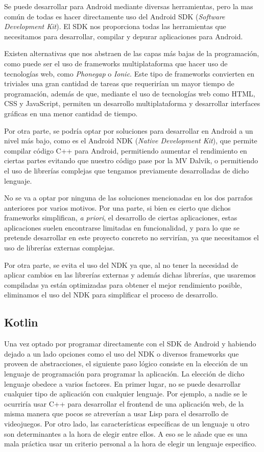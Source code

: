 Se puede desarrollar para Android mediante diversas herramientas, pero la mas común de todas es hacer directamente uso del Android SDK (\textit{Software Development Kit}). El SDK nos proporciona todas las herramientas que necesitamos para desarrollar, compilar y depurar aplicaciones para Android.

Existen alternativas que nos abstraen de las capas más bajas de la programación, como puede ser el uso de frameworks multiplataforma que hacer uso de tecnologías web, como \textit{Phonegap} o \textit{Ionic}. Este tipo de frameworks convierten en triviales una gran cantidad de tareas que requerirían un mayor tiempo de programación, además de que, mediante el uso de tecnologías web como HTML, CSS y JavaScript, permiten un desarrollo multiplataforma y desarrollar interfaces gráficas en una menor cantidad de tiempo.

Por otra parte, se podría optar por soluciones para desarrollar en Android a un nivel más bajo, como es el Android NDK (\textit{Native Development Kit}), que permite compilar código C++ para Android, permitiendo aumentar el rendimiento en ciertas partes evitando que nuestro código pase por la MV Dalvik, o permitiendo el uso de librerías complejas que tengamos previamente desarrolladas de dicho lenguaje.

No se va a optar por ninguna de las soluciones mencionadas en los dos parrafos anteriores por varios motivos. Por una parte, si bien es cierto que dichos frameworks simplifican, \textit{a priori}, el desarrollo de ciertas aplicaciones, estas aplicaciones suelen encontrarse limitadas en funcionalidad, y para lo que se pretende desarrollar en este proyecto concreto no servirían, ya que necesitamos el uso de librerías externas complejas.

Por otra parte, se evita el uso del NDK ya que, al no tener la necesidad de aplicar cambios en las librerías externas y además dichas librerías, que usaremos compiladas ya están optimizadas para obtener el mejor rendimiento posible, eliminamos el uso del NDK para simplificar el proceso de desarrollo.

\subsection{Kotlin}

Una vez optado por programar directamente con el SDK de Android y habiendo dejado a un lado opciones como el uso del NDK o diversos frameworks que proveen de abstracciones, el siguiente paso lógico consiste en la elección de un lenguaje de programación para programar la aplicación. La elección de dicho lenguaje obedece a varios factores. En primer lugar, no se puede desarrollar cualquier tipo de aplicación con cualquier lenguaje. Por ejemplo, a nadie se le ocurriría usar C++ para desarrollar el frontend de una aplicación web, de la misma manera que pocos se atreverían a usar Lisp para el desarrollo de videojuegos. Por otro lado, las características específicas de un lenguaje u otro son determinantes a la hora de elegir entre ellos. A eso se le añade que es una mala práctica usar un criterio personal a la hora de elegir un lenguaje especifico.

